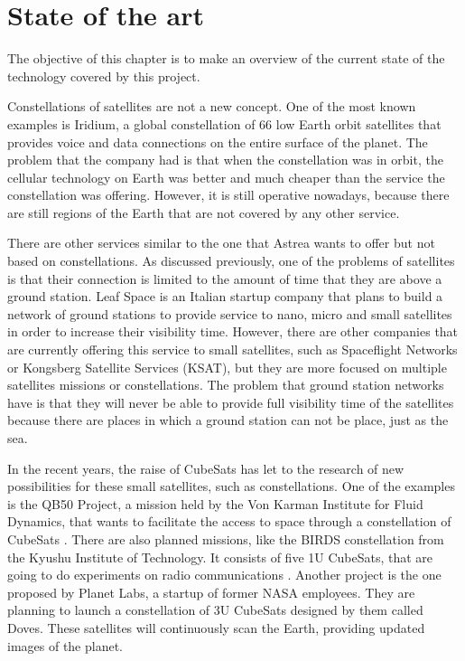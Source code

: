 \chapter{State of the art}
The objective of this chapter is to make an overview of the current state of the technology covered by this project. 

Constellations of satellites are not a new concept. One of the most known examples is Iridium, a global constellation of 66 low Earth orbit satellites that provides voice and data connections on the entire surface of the planet. The problem that the company had is that when the constellation was in orbit, the cellular technology on Earth was better and much cheaper than the service the constellation was offering. However, it is still operative nowadays, because there are still regions of the Earth that are not covered by any other service.

There are other services similar to the one that Astrea wants to offer but not based on constellations. As discussed previously, one of the problems of satellites is that their connection is limited to the amount of time that they are above a ground station. Leaf Space is an Italian startup company that plans to build a network of ground stations to provide service to nano, micro and small satellites in order to increase their visibility time. However, there are other companies that are currently offering this service to small satellites, such as Spaceflight Networks or Kongsberg Satellite Services (KSAT), but they are more focused on multiple satellites missions or constellations. The problem that ground station networks have is that they will never be able to provide full visibility time of the satellites because there are places in which a ground station can not be place, just as the sea.

In the recent years, the raise of CubeSats has let to the research of new possibilities for these small satellites, such as constellations. One of the examples is the QB50 Project, a mission held by the Von Karman Institute for Fluid Dynamics, that wants to facilitate the access to space through a constellation of CubeSats \cite{qb50}. There are also planned missions, like the BIRDS constellation from the Kyushu Institute of Technology. It consists of five 1U CubeSats, that are going to do experiments on radio communications \cite{KyushuInstituteofTechnology2017}. Another project is the one proposed by Planet Labs, a startup of former NASA employees. They are planning to launch a constellation of 3U CubeSats designed by them called Doves. These satellites will continuously scan the Earth, providing updated images of the planet.

